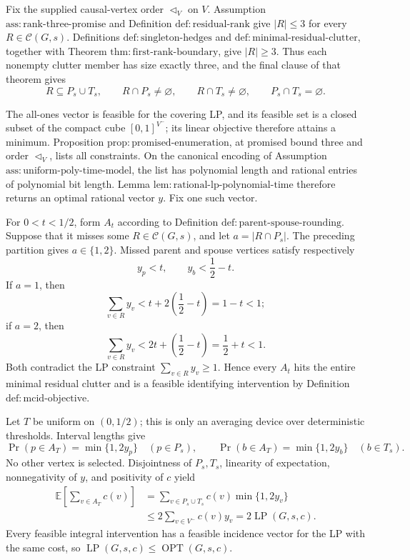 Fix the supplied causal-vertex order \(\triangleleft_V\) on \(V\).
Assumption \(\mathrm{ass{:}rank\mbox{-}three\mbox{-}promise}\) and
Definition \(\mathrm{def{:}residual\mbox{-}rank}\) give \(|R|\leq3\) for
every \(R\in\mathcal C(G,s)\).  Definitions
\(\mathrm{def{:}singleton\mbox{-}hedges}\) and
\(\mathrm{def{:}minimal\mbox{-}residual\mbox{-}clutter}\), together with
Theorem \(\mathrm{thm{:}first\mbox{-}rank\mbox{-}boundary}\), give
\(|R|\geq3\).  Thus each nonempty clutter member has size exactly three,
and the final clause of that theorem gives
\[
 R\subseteq P_s\cup T_s,\qquad
 R\cap P_s\neq\varnothing,\qquad
 R\cap T_s\neq\varnothing,\qquad
 P_s\cap T_s=\varnothing.
\]

The all-ones vector is feasible for the covering LP, and its feasible set
is a closed subset of the compact cube \([0,1]^{V^{-}}\); its linear
objective therefore attains a minimum.  Proposition
\(\mathrm{prop{:}promised\mbox{-}enumeration}\), at promised bound three
and order \(\triangleleft_V\), lists all constraints.  On the canonical
encoding of Assumption
\(\mathrm{ass{:}uniform\mbox{-}poly\mbox{-}time\mbox{-}model}\), the list
has polynomial length and rational entries of polynomial bit length.
Lemma \(\mathrm{lem{:}rational\mbox{-}lp\mbox{-}polynomial\mbox{-}time}\)
therefore returns an optimal rational vector \(y\).  Fix one such vector.

For \(0<t<1/2\), form \(A_t\) according to Definition
\(\mathrm{def{:}parent\mbox{-}spouse\mbox{-}rounding}\).  Suppose that it
misses some \(R\in\mathcal C(G,s)\), and let
\(a=|R\cap P_s|\).  The preceding partition gives \(a\in\{1,2\}\).
Missed parent and spouse vertices satisfy respectively
\[
 y_p<t,
 \qquad
 y_b<\frac12-t.
\]
If \(a=1\), then
\[
 \sum_{v\in R}y_v
 <t+2\left(\frac12-t\right)=1-t<1;
\]
if \(a=2\), then
\[
 \sum_{v\in R}y_v
 <2t+\left(\frac12-t\right)=\frac12+t<1.
\]
Both contradict the LP constraint \(\sum_{v\in R}y_v\geq1\).  Hence every
\(A_t\) hits the entire minimal residual clutter and is a feasible
identifying intervention by Definition
\(\mathrm{def{:}mcid\mbox{-}objective}\).

Let \(T\) be uniform on \((0,1/2)\); this is only an averaging device over
deterministic thresholds.  Interval lengths give
\[
 \Pr(p\in A_T)=\min\{1,2y_p\}\quad(p\in P_s),
 \qquad
 \Pr(b\in A_T)=\min\{1,2y_b\}\quad(b\in T_s).
\]
No other vertex is selected.  Disjointness of \(P_s,T_s\), linearity of
expectation, nonnegativity of \(y\), and positivity of \(c\) yield
\[
 \begin{aligned}
 \mathbb E\!\left[\sum_{v\in A_T}c(v)\right]
 &=\sum_{v\in P_s\cup T_s}c(v)\min\{1,2y_v\}\\
 &\leq2\sum_{v\in V^{-}}c(v)y_v
 =2\operatorname{LP}(G,s,c).
 \end{aligned}
\]
Every feasible integral intervention has a feasible incidence vector for
the LP with the same cost, so
\(\operatorname{LP}(G,s,c)\leq\operatorname{OPT}(G,s,c)\).

